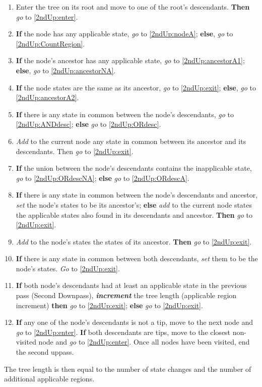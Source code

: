 \documentclass[a4paper,12pt]{article}
\begin{document}
\begin{enumerate}
    \item Enter the tree on its root and move to one of the root's descendants. \textbf{Then} \textit{go} to \ref{2ndUp:enter}.
    \item \label{2ndUp:enter} \textbf{If} the node has any applicable state, \textit{go} to \ref{2ndUp:nodeA}; \textbf{else}, \textit{go} to \ref{2ndUp:CountRegion}.
    \item \label{2ndUp:nodeA} \textbf{If} the node's ancestor has any applicable state, \textit{go} to \ref{2ndUp:ancestorA1}; \textbf{else}, \textit{go} to \ref{2ndUp:ancestorNA}.
    \item \label{2ndUp:ancestorA1} \textbf{If} the node states are the same as its ancestor, \textit{go} to \ref{2ndUp:exit}; \textbf{else}, \textit{go} to \ref{2ndUp:ancestorA2}.
    \item \label{2ndUp:ancestorA2} \textbf{If} there is any state in common between the node's descendants, \textit{go} to \ref{2ndUp:ANDdesc}; \textbf{else} \textit{go} to \ref{2ndUp:ORdesc}.
    \item \label{2ndUp:ANDdesc} \textit{Add} to the current node any state in common between its ancestor and its descendants. Then \textit{go} to \ref{2ndUp:exit}.
    \item \label{2ndUp:ORdesc} \textbf{If} the union between the node's descendants contains the inapplicable state, \textit{go} to \ref{2ndUp:ORdescNA}; \textbf{else} \textit{go} to \ref{2ndUp:ORdescA}.
    \item \label{2ndUp:ORdescNA} \textbf{If} there is any state in common between the node's descendants and ancestor, \textit{set} the node's states to be its ancestor's; \textbf{else} \textit{add} to the current node states the applicable states also found in its descendants and ancestor. \textbf{Then} \textit{go} to \ref{2ndUp:exit}.
    \item \label{2ndUp:ORdescA} \textit{Add} to the node's states the states of its ancestor. \textbf{Then} \textit{go} to \ref{2ndUp:exit}.
    \item \label{2ndUp:ancestorNA} \textbf{If} there is any state in common between both descendants, \textit{set} them to be the node's states. \textit{Go} to \ref{2ndUp:exit}. %
    \item \label{2ndUp:CountRegion} \textbf{If} both node's descendants had at least an applicable state in the previous pass (Second Downpass), \textbf{\textit{increment}} the tree length (applicable region increment) \textbf{then} \textit{go} to \ref{2ndUp:exit}; \textbf{else} \textit{go} to \ref{2ndUp:exit}.
    \item \label{2ndUp:exit} \textbf{If} any one of the node's descendants is not a tip, move to the next node and \textit{go} to \ref{2ndUp:enter}. \textbf{If} both descendants are tips, move to the closest non-visited node and \textit{go} to \ref{2ndUp:enter}. Once all nodes have been visited, end the second uppass.
\end{enumerate}

The tree length is then equal to the number of state changes and the number of additional applicable regions.
\end{document}
